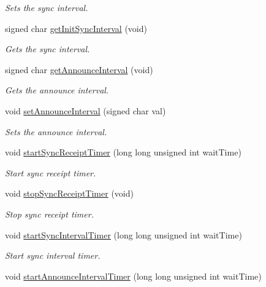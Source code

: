\begin{DoxyCompactItemize}
\begin{DoxyCompactList}\small\item\em Sets the sync interval. \end{DoxyCompactList}\item 
signed char \hyperlink{class_common_port_af10585c4e9853d5a958933d5c5357445}{get\+Init\+Sync\+Interval} (void)
\begin{DoxyCompactList}\small\item\em Gets the sync interval. \end{DoxyCompactList}\item 
signed char \hyperlink{class_common_port_a7aa1a5fddf7129f600c97c018087b7b8}{get\+Announce\+Interval} (void)
\begin{DoxyCompactList}\small\item\em Gets the announce interval. \end{DoxyCompactList}\item 
void \hyperlink{class_common_port_a55a6b4ff487cd157501f921a27db0d9c}{set\+Announce\+Interval} (signed char val)
\begin{DoxyCompactList}\small\item\em Sets the announce interval. \end{DoxyCompactList}\item 
void \hyperlink{class_common_port_a25bf37b5026e4b86b138498915330656}{start\+Sync\+Receipt\+Timer} (long long unsigned int wait\+Time)
\begin{DoxyCompactList}\small\item\em Start sync receipt timer. \end{DoxyCompactList}\item 
void \hyperlink{class_common_port_af3b46893f10141406c791c89d3e54b8d}{stop\+Sync\+Receipt\+Timer} (void)
\begin{DoxyCompactList}\small\item\em Stop sync receipt timer. \end{DoxyCompactList}\item 
void \hyperlink{class_common_port_a2033d126c19548eb5ada2d623667e1f2}{start\+Sync\+Interval\+Timer} (long long unsigned int wait\+Time)
\begin{DoxyCompactList}\small\item\em Start sync interval timer. \end{DoxyCompactList}\item 
void \hyperlink{class_common_port_a3938df4f200087f96727e90805c543c9}{start\+Announce\+Interval\+Timer} (long long unsigned int wait\+Time)

\end{DoxyCompactItemize}

